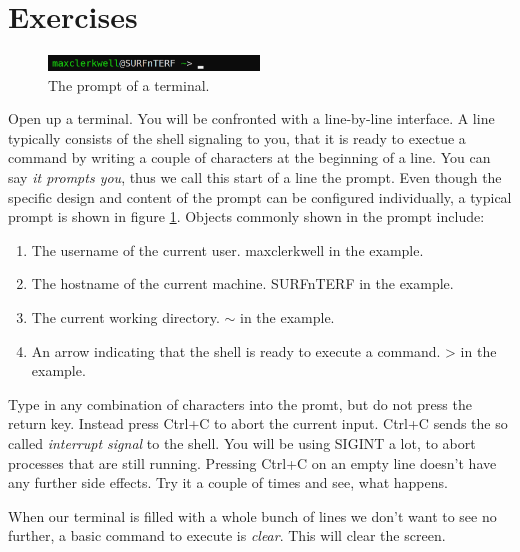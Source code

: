 \documentclass{dcbl/challenge}
\begin{document}
\section*{Exercises}
\begin{aufgabe}
    \begin{figure}
        \centering
        \includegraphics[width=0.5\textwidth]{prompt.png}
        \caption{The prompt of a terminal.}
        \label{fig:prompt}
    \end{figure}
    Open up a terminal. 
    You will be confronted with a line-by-line interface. 
    A line typically consists of the shell signaling to you, that it is ready to exectue a command by writing a couple of characters at the beginning of a line. You can say \textit{it prompts you}, thus we call this start of a line the prompt.
    Even though the specific design and content of the prompt can be configured individually, a typical prompt is shown in figure \ref{fig:prompt}.
    Objects commonly shown in the prompt include:
    \begin{enumerate}
        \item The username of the current user. maxclerkwell in the example.
        \item The hostname of the current machine. SURFnTERF in the example.
        \item The current working directory. $\sim$ in the example.
        \item An arrow indicating that the shell is ready to execute a command. > in the example.
    \end{enumerate}
    Type in any combination of characters into the promt, but do not press the return key.
    Instead press Ctrl+C to abort the current input. 
    Ctrl+C sends the so called \textit{interrupt signal} to the shell.
    You will be using SIGINT a lot, to abort processes that are still running.
    Pressing Ctrl+C on an empty line doesn't have any further side effects. 
    Try it a couple of times and see, what happens.
\end{aufgabe}
\begin{aufgabe}
    When our terminal is filled with a whole bunch of lines we don't want to see no further, a basic command to execute is \textit{clear}. 
    This will clear the screen.
\end{aufgabe}
\end{document}
